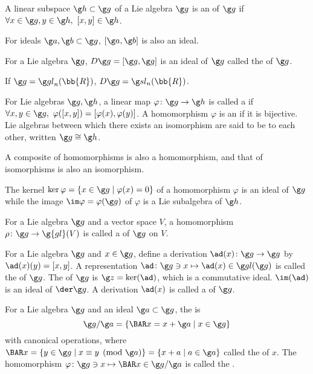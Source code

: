 A linear subspace $\g h \subset \g g$ of a Lie algebra $\g g$ is an  of $\g g$ if $\forall x \in \g g, y \in \g h,\ [x,y] \in \g h$.

For ideals $\g a, \g b \subset \g g$, $[\g a, \g b]$ is also an ideal.

For a Lie algebra $\g g$, $D\g g = [\g g, \g g]$ is an ideal of $\g g$ called the  of $\g g$.

If $\g g = \gl_n(\bb{R})$, $D\g g = \sl_n(\bb{R})$.

For Lie algebras $\g g, \g h$, a linear map $\varphi \colon \g g \to \g h$ is called a  if $\forall x, y \in \g g,\ \varphi([x,y]) = [\varphi(x), \varphi(y)]$. A homomorphism $\varphi$ is an  if it is bijective. Lie algebras between which there exists an isomorphism are said to be  to each other, written $\g g \cong \g h$.

A composite of homomorphisms is also a homomorphism, and that of isomorphisms is also an isomorphism.

The kernel $\ker \varphi = \{ x \in \g g \mid \varphi(x) = 0 \}$ of a homomorphism $\varphi$ is an ideal of $\g g$ while the image $\im \varphi = \varphi(\g g)$ of $\varphi$ is a Lie subalgebra of $\g h$.

For a Lie algebra $\g g$ and a vector space $V$, a homomorphism $\rho \colon \g g \to \g{gl}(V)$ is called a  of $\g g$ on $V$.

For a Lie algebra $\g g$ and $x \in \g g$, define a derivation $\ad (x) \colon \g g \to \g g$ by $\ad(x)(y) = [x,y]$. A representation $\ad \colon \g g \ni x \mapsto \ad(x) \in \gl (\g g)$ is called the  of $\g g$. The  of $\g g$ is $\g z = \ker(\ad)$, which is a commutative ideal. $\im(\ad)$ is an ideal of $\der \g g$. A derivation $\ad(x)$ is called a  of $\g g$.

For a Lie algebra $\g g$ and an ideal $\g a \subset \g g$, the  is
\[
\g g / \g a = \{ \BAR x = x + \g a \mid x \in \g g \}
\]
with canonical operations, where $\BAR x = \{ y \in \g g \mid x \equiv y \pmod{\g a} \} = \{ x + a \mid a \in \g a \}$ called the  of $x$. The homomorphism $\varphi \colon \g g \ni x \mapsto \BAR x \in \g g / \g a$ is called the .

